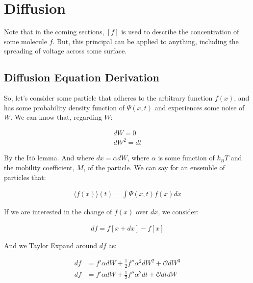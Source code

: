 \section{Diffusion}

 Note that in the coming sections, $[f]$ is used to describe the concentration of some molecule $f$. But, this principal can be applied to anything, including the spreading of voltage across some surface. 

 \subsection{Diffusion Equation Derivation}

So, let's consider some particle that adheres to the arbitrary function $f(x)$, and has some probability density function of $\Psi(x,t)$ and experiences some noise of $W$. We can know that, regarding $W$:

\begin{equation}
\begin{split}
    dW = 0 \\
    dW^2 = dt
\end{split}
\end{equation}

By the It$\overline{\mathrm{o}}$ lemma. And where $dx = \alpha dW$, where $\alpha$ is some function of $k_BT$ and the mobility coefficient, $M$, of the particle. We can say for an ensemble of particles that: 

\begin{equation}
\begin{split}
    \langle f(x) \rangle(t) = \int \Psi(x,t) f(x) dx
\end{split}
\end{equation}

If we are interested in the change of $f(x)$ over $dx$, we consider: 

\begin{equation}
\begin{split}
    df = f[x + dx] - f[x] 
\end{split}
\end{equation}

And we Taylor Expand around $df$ as: 

\begin{equation}
\begin{split}
    df & = f'\alpha dW + \frac{1}{2}f''\alpha^2 dW^2 + \mathcal{O}dW^3 \\
    df & = f'\alpha dW + \frac{1}{2}f''\alpha^2 dt + \mathcal{O}dtdW
\end{split}
\end{equation}

